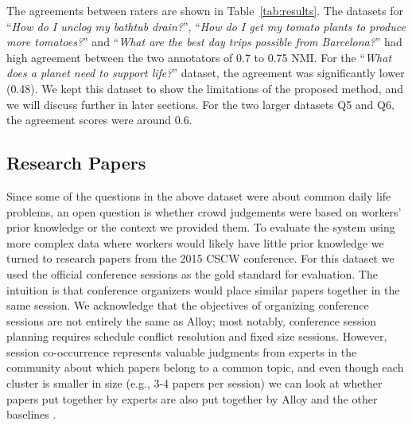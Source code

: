 
The agreements between raters are shown in Table~\ref{tab:results}. The datasets
for ``\emph{How do I unclog my bathtub drain?}'', ``\emph{How do I get my
	tomato plants to produce more tomatoes?}'' and ``\emph{What are the best day trips possible from Barcelona?}'' had high agreement between the
two annotators of 0.7 to 0.75 NMI. For
the ``\emph{What does a planet need to support life?}'' dataset, the agreement
was significantly lower (0.48). We kept this dataset to show the limitations of the proposed method, and we will discuss further in later sections. For the two larger datasets Q5 and Q6, the agreement scores were around 0.6.


\subsection{Research Papers}

Since some of the questions in the above dataset were about common daily life problems, an open question is whether crowd judgements were  based on workers' prior knowledge or the context we provided them. To evaluate the system using more complex data where workers would likely have little prior knowledge we turned to research papers from the 2015 CSCW conference. For this dataset we used the official conference sessions as the gold standard for evaluation. The intuition is that
conference organizers would place similar papers together in the same session. We acknowledge that the objectives
of organizing conference sessions are not entirely the same as Alloy; most notably, conference session planning requires schedule conflict resolution and fixed size sessions. However, session co-occurrence represents valuable judgments from experts
in the community about which papers belong to a common topic, and even though each cluster
is smaller in size (e.g., 3-4 papers per session) we can look at whether papers put together
by experts are also put together by Alloy and the other baselines \cite{chilton2014frenzy}.

